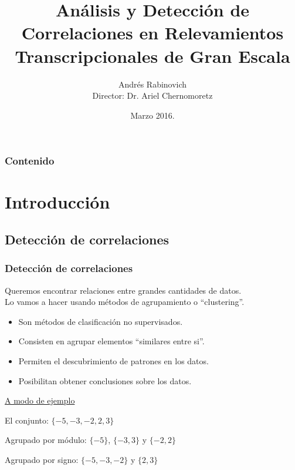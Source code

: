 \documentclass[serif,9pt, t]{beamer}
\newif\ifplacelogo %
\begin{document}
\title[Análisis y Detección de Correlaciones en Relevamien\ldots ]{Análisis y Detección de Correlaciones en Relevamientos Transcripcionales de Gran Escala}  
\author[Andrés Rabinovich]{Andrés Rabinovich\\{\small Director: Dr. Ariel Chernomoretz}}

\date{Marzo 2016.}


\begin{frame}
\titlepage
\end{frame}

\placelogofalse

\begin{frame}
\frametitle{Contenido}
\tableofcontents
\end{frame} 

\section{Introducción} 

\subsection{Detección de correlaciones}
\begin{frame}\frametitle{Detección de correlaciones} 
\large
Queremos encontrar relaciones entre grandes cantidades de datos.\\\bigskip
Lo vamos a hacer usando métodos de agrupamiento o ``clustering''.\medskip
\normalsize
\begin{itemize}
\item Son métodos de clasificación no supervisados.
\item Consisten en agrupar elementos ``similares entre si''.
\item Permiten el descubrimiento de patrones en los datos.
\item Posibilitan obtener conclusiones sobre los datos.
\end{itemize}
\bigskip
\underline{A modo de ejemplo}\medskip

El conjunto: $\{-5, -3, -2, 2, 3\}$\medskip

Agrupado por módulo: $\{-5\}$, $\{-3, 3\}$ y $\{-2, 2\}$\medskip

Agrupado por signo: $\{-5, -3, -2\}$ y $\{2, 3\}$
\end{frame}
\end{document}
